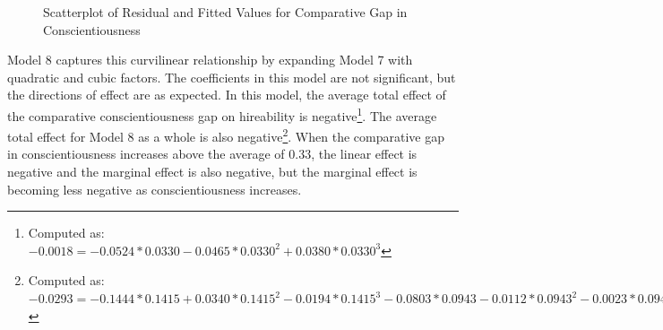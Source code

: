 \documentclass[review]{elsarticle}
\begin{document}
\begin{figure}[h!]
    \centering
    \caption{Scatterplot of Residual and Fitted Values for Comparative Gap in Conscientiousness}
    \label{fig:conc_rvfp}
\end{figure}

Model 8 captures this curvilinear relationship by expanding Model 7 with quadratic and cubic factors.
The coefficients in this model are not significant, but the directions of effect are as expected.
In this model, the average total effect of the comparative conscientiousness gap on hireability is negative\footnote{
    Computed as:
    $-0.0018 = - 0.0524*0.0330 - 0.0465*0.0330^2 + 0.0380*0.0330^3$
}.
The average total effect for Model 8 as a whole is also negative\footnote{
    Computed as:
    $-0.0293 = -0.1444*0.1415 + 0.0340*0.1415^2 - 0.0194*0.1415^3 - 0.0803*0.0943 - 0.0112*0.0943^2 - 0.0023*0.0943^3 - 0.0524*0.0330 - 0.0465*0.0330^2 + 0.0380*0.0330^3$
}.
When the comparative gap in conscientiousness increases above the average of 0.33,
the linear effect is negative and the marginal effect is also negative,
but the marginal effect is becoming less negative as conscientiousness increases.
\end{document}
